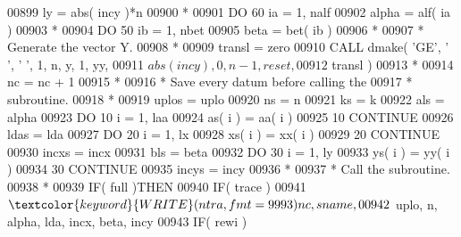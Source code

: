 \begin{DoxyCode}
00899                      ly = abs( incy )*n
00900 \textcolor{comment}{*}
00901                      \textcolor{keywordflow}{DO} 60 ia = 1, nalf
00902                         alpha = alf( ia )
00903 \textcolor{comment}{*}
00904                         \textcolor{keywordflow}{DO} 50 ib = 1, nbet
00905                            beta = bet( ib )
00906 \textcolor{comment}{*}
00907 \textcolor{comment}{*                          Generate the vector Y.}
00908 \textcolor{comment}{*}
00909                            transl = zero
00910                            \textcolor{keyword}{CALL }dmake( \textcolor{stringliteral}{'GE'}, \textcolor{stringliteral}{' '}, \textcolor{stringliteral}{' '}, 1, n, y, 1, yy,
00911      $                                 abs( incy ), 0, n - 1, reset,
00912      $                                 transl )
00913 \textcolor{comment}{*}
00914                            nc = nc + 1
00915 \textcolor{comment}{*}
00916 \textcolor{comment}{*                          Save every datum before calling the}
00917 \textcolor{comment}{*                          subroutine.}
00918 \textcolor{comment}{*}
00919                            uplos = uplo
00920                            ns = n
00921                            ks = k
00922                            als = alpha
00923                            \textcolor{keywordflow}{DO} 10 i = 1, laa
00924                               as( i ) = aa( i )
00925    10                      \textcolor{keywordflow}{CONTINUE}
00926                            ldas = lda
00927                            \textcolor{keywordflow}{DO} 20 i = 1, lx
00928                               xs( i ) = xx( i )
00929    20                      \textcolor{keywordflow}{CONTINUE}
00930                            incxs = incx
00931                            bls = beta
00932                            \textcolor{keywordflow}{DO} 30 i = 1, ly
00933                               ys( i ) = yy( i )
00934    30                      \textcolor{keywordflow}{CONTINUE}
00935                            incys = incy
00936 \textcolor{comment}{*}
00937 \textcolor{comment}{*                          Call the subroutine.}
00938 \textcolor{comment}{*}
00939                            \textcolor{keywordflow}{IF}( full )\textcolor{keywordflow}{THEN}
00940                               \textcolor{keywordflow}{IF}( trace )
00941      $                           \textcolor{keyword}{WRITE}( ntra, fmt = 9993 )nc, sname,
00942      $                           uplo, n, alpha, lda, incx, beta, incy
00943                               \textcolor{keywordflow}{IF}( rewi )

\end{DoxyCode}
